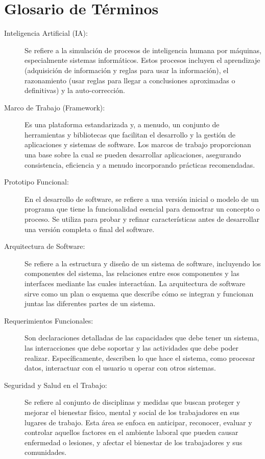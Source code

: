 \section{Glosario de Términos}
\label{sec:glosario}
\begin{description}
    \item [Inteligencia Artificial (IA):] Se refiere a la simulación de procesos de inteligencia humana por máquinas, especialmente sistemas informáticos. Estos procesos incluyen el aprendizaje (adquisición de información y reglas para usar la información), el razonamiento (usar reglas para llegar a conclusiones aproximadas o definitivas) y la auto-corrección.
    
    \item [Marco de Trabajo (Framework):] Es una plataforma estandarizada y, a menudo, un conjunto de herramientas y bibliotecas que facilitan el desarrollo y la gestión de aplicaciones y sistemas de software. Los marcos de trabajo proporcionan una base sobre la cual se pueden desarrollar aplicaciones, asegurando consistencia, eficiencia y a menudo incorporando prácticas recomendadas.

    \item [Prototipo Funcional:] En el desarrollo de software, se refiere a una versión inicial o modelo de un programa que tiene la funcionalidad esencial para demostrar un concepto o proceso. Se utiliza para probar y refinar características antes de desarrollar una versión completa o final del software.
    
    \item [Arquitectura de Software:] Se refiere a la estructura y diseño de un sistema de software, incluyendo los componentes del sistema, las relaciones entre esos componentes y las interfaces mediante las cuales interactúan. La arquitectura de software sirve como un plan o esquema que describe cómo se integran y funcionan juntas las diferentes partes de un sistema.

    \item [Requerimientos Funcionales:] Son declaraciones detalladas de las capacidades que debe tener un sistema, las interacciones que debe soportar y las actividades que debe poder realizar. Específicamente, describen lo que hace el sistema, como procesar datos, interactuar con el usuario u operar con otros sistemas.

    \item [Seguridad y Salud en el Trabajo:] Se refiere al conjunto de disciplinas y medidas que buscan proteger y mejorar el bienestar físico, mental y social de los trabajadores en sus lugares de trabajo. Esta área se enfoca en anticipar, reconocer, evaluar y controlar aquellos factores en el ambiente laboral que pueden causar enfermedad o lesiones, y afectar el bienestar de los trabajadores y sus comunidades.


\end{description}
